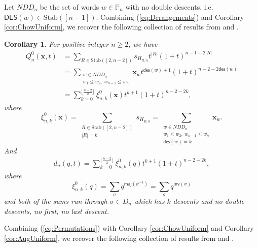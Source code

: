 \documentclass[reqno]{amsart}
\newcommand{\DES}{{\mathsf{DES}}}
\newcommand{\des}{{\mathsf{des}}}
\newcommand{\inv}{{\mathsf{inv}}}
\newcommand{\maj}{{\mathsf{maj}}}
\newcommand{\Stab}{{\mathrm{Stab}}}
\newcommand{\x}{{\mathbf{x}}}
\newtheorem{cor}[thm]{Corollary}
\theoremstyle{definition}
\theoremstyle{remark}
\begin{document}
Let $NDD_n$ be the set of words $w\in\mathbb{P}_n$ with no double descents, i.e. $\DES(w)\in\Stab([n-1])$. Combining (\ref{eq:Derangements}) and Corollary \ref{cor:ChowUniform}, we recover the following collection of results from \cite[Theorem 7.3, Equation (7.9)]{ShareshianWachs2010} and \cite[Theorem 6.1]{ShareshianWachs2020}.

\begin{cor} \label{cor:Derangements}
For positive integer $n\ge 2$, we have 
\begin{align*}
    Q_n^0(\x,t)
    &=\sum_{R\in\Stab([2,n-2])}s_{H_{R,n}}t^{|R|}(1+t)^{n-1-2|R|}\\
    &=\sum_{\substack{w\in NDD_n\\ w_1\le w_2,~w_{n-1}\le w_n}}\x_w t^{\des(w)+1}(1+t)^{n-2-2\des(w)}\\
    &=\sum_{k=0}^{\lfloor\frac{n-2}{2}\rfloor}\xi_{n,k}^0(\x) t^{k+1}(1+t)^{n-2-2k},
\end{align*}
where 
\[
    \xi_{n,k}^0(\x)=\sum_{\substack{R\in\Stab([2,n-2])\\ |R|=k}}s_{H_{R,n}}=\sum_{\substack{w\in NDD_n\\ w_1\le w_2,~w_{n-1}\le w_n \\ \des(w)=k}}\x_w.
\]
And
\begin{align*}
    d_n(q,t)=\sum_{k=0}^{\lfloor\frac{n-2}{2}\rfloor}\xi_{n,k}^0(q)t^{k+1}(1+t)^{n-2-2k},
\end{align*}
where
\[
    \xi_{n,k}^0(q)=\sum_{\sigma}q^{\maj(\sigma^{-1})}=\sum_{\sigma}q^{\inv(\sigma)}
\]
and both of the sums run through $\sigma\in D_n$ which has $k$ descents and no double descents, no first, no last descent.
\end{cor}

Combining (\ref{eq:Permutations}) with Corollary \ref{cor:ChowUniform} and Corollary \ref{cor:AugUniform}, we recover the following collection of results from \cite[Theorem 7.3, Equation (7.8)]{ShareshianWachs2010} and \cite[Equations (1.4) and (6.1)]{LinussonShareshianWachs2012}.
\end{document}
